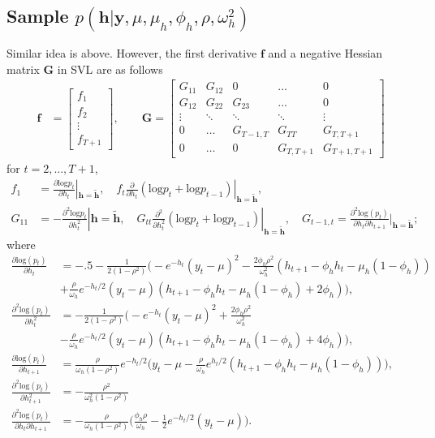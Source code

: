 \documentclass[11pt]{article}
\newcommand{\bbmatrix}{\begin{bmatrix}}
\newcommand{\ebmatrix}{\end{bmatrix}}
\numberwithin{equation}{section}
\begin{document}
\subsection*{Sample $p(\mathbf{h}|\mathbf{y}, \mu, \mu_h, \phi_h, \rho, \omega^2_h)$}
Similar idea is above. However, the first derivative $\mathbf{f}$ and a negative Hessian matrix $\mathbf{G}$ in SVL are as follows 
\begin{align*}
\mathbf{f}&=\bbmatrix f_1 \\ f_2 \\ \vdots \\f_{T+1} \ebmatrix, \qquad \mathbf{G} =\bbmatrix
G_{11} & G_{12} & 0 & \ldots & 0 \\
G_{12} & G_{22} & G_{23} & \ldots & 0 \\
\vdots & \ddots & \ddots& \ddots & \vdots\\
0 & \ldots & G_{T-1,T} & G_{TT} & G_{T,T+1}\\  
0 & \ldots & 0 & G_{T,T+1} & G_{T+1, T+1}
\ebmatrix
\end{align*}
for $t=2, \ldots, T+1$,
\begin{align*}
f_1&=\frac{\partial \text{log} p_t}{\partial h_t}|_{\mathbf{h}=\tilde{\mathbf{h}}},  \quad f_t \frac{\partial}{\partial h_t}(\text{log}p_t + \text{log} p_{t-1})|_{\mathbf{h}=\tilde{\mathbf{h}}},\\
G_{11} &=-\frac{\partial^2 \text{log}p_t}{\partial h^2_t}|{\mathbf{h}=\tilde{\mathbf{h}}}, \quad G_{tt} \frac{\partial^2}{\partial h^2_t}(\text{log}p_t + \text{log} p_{t-1})|_{\mathbf{h}=\tilde{\mathbf{h}}}, \quad G_{t-1,t}=\frac{\partial^2 \text{log}(p_t)}{\partial h_t \partial h_{t+1}}|_{\mathbf{h}=\tilde{\mathbf{h}}}; 
\end{align*}
where
\begin{align*}
\frac{\partial \text{log}(p_t)}{\partial h_t}&=-.5 -\frac{1}{2(1-\rho^2)} \Big(-e^{-h_t}(y_t -\mu)^2 - \frac{2\phi_h \rho^2}{\omega^2_h}(h_{t+1}-\phi_hh_t -\mu_h (1-\phi_h) ) \\
& +\frac{\rho}{\omega_h} e^{-h_t/2}(y_t -\mu)(h_{t+1} -\phi_hh_t -\mu_h(1-\phi_h)+2\phi_h) \Big),\\
\frac{\partial^2 \text{log}(p_t)}{\partial h^2_t}&= -\frac{1}{2(1-\rho^2)} \Big(-e^{-h_t}(y_t -\mu)^2 + \frac{2\phi_h \rho^2}{\omega^2_h} \\
& -\frac{\rho}{\omega_h} e^{-h_t/2}(y_t -\mu)(h_{t+1} -\phi_hh_t -\mu_h(1-\phi_h)+4\phi_h) \Big),\\
\frac{\partial \text{log}(p_t)}{\partial h_{t+1}}&=\frac{\rho}{\omega_h(1-\rho^2)} e^{-h_t/2}\Big(y_t -\mu 
-\frac{\rho}{\omega_h} e^{h_t/2}(h_{t+1} -\phi_hh_t -\mu_h(1-\phi_h)) \Big),\\
\frac{\partial^2 \text{log}(p_t)}{\partial h^2_{t+1}}&=-\frac{\rho^2}{\omega_h^2(1-\rho^2)} \\
\frac{\partial^2 \text{log}(p_t)}{\partial h_{t}\partial h_{t+1}}&=-\frac{\rho}{\omega_h(1-\rho^2)}\Big( \frac{\phi_h \rho}{\omega_h} -\frac{1}{2}e^{-h_t/2}(y_t-\mu)\Big). \\
\end{align*}
\end{document}

